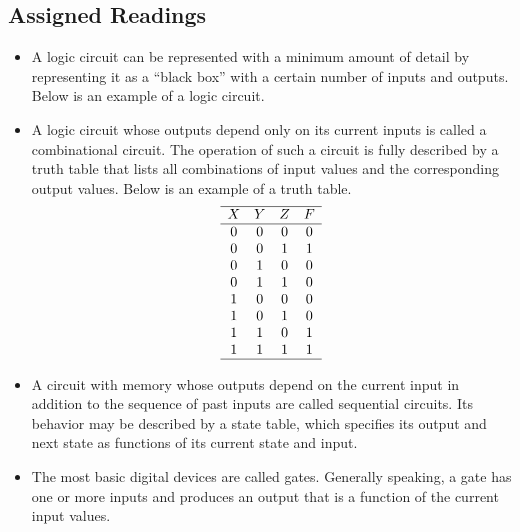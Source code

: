\documentclass[10pt,a4paper]{article}
\begin{document}
\subsection{Assigned Readings}
\begin{itemize}
\item A logic circuit can be represented with a minimum amount of detail by representing it as a ``black box'' with a certain number of inputs and outputs. Below is an example of a logic circuit.\\
\item A logic circuit whose outputs depend only on its current inputs is called a combinational circuit. The operation of such a circuit is fully described by a truth table that lists all combinations of input values and the corresponding output values. Below is an example of a truth table.\\
\begin{displaymath}
\begin{array}{c c c c}
\hline
X & Y & Z & F\\
\hline
0 & 0 & 0 & 0\\
0 & 0 & 1 & 1\\
0 & 1 & 0 & 0\\
0 & 1 & 1 & 0\\
1 & 0 & 0 & 0\\
1 & 0 & 1 & 0\\
1 & 1 & 0 & 1\\
1 & 1 & 1 & 1\\
\hline
\end{array}
\end{displaymath}
\item A circuit with memory whose outputs depend on the current input in addition to the sequence of past inputs are called sequential circuits. Its behavior may be described by a state table, which specifies its output and next state as functions of its current state and input. 
\item The most basic digital devices are called gates. Generally speaking, a gate has one or more inputs and produces an output that is a function of the current input values. 

\end{itemize}
\end{document}

